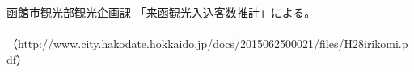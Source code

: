 \documentclass[openany,11pt,papersize]{jsbook}
\begin{document}
\begin{appendix}
\end{appendix}



\begin{thebibliography}{9}
 函館市観光部観光企画課 「来函観光入込客数推計」による。
　　（http://www.city.hakodate.hokkaido.jp/docs/2015062500021/files/H28irikomi.pdf）
\end{thebibliography}
\end{document}
